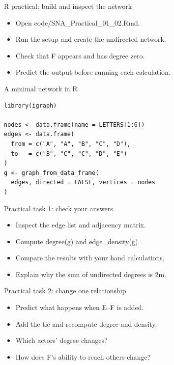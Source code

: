 \documentclass[aspectratio=169,11pt]{beamer}
\begin{document}
\begin{frame}{R practical: build and inspect the network}
\begin{itemize}
\item Open code/SNA\_Practical\_01\_02.Rmd.
\medskip
\item Run the setup and create the undirected network.
\medskip
\item Check that F appears and has degree zero.
\medskip
\item Predict the output before running each calculation.
\medskip
\end{itemize}

\end{frame}

\begin{frame}[fragile]{A minimal network in R}
\begin{lstlisting}
library(igraph)

nodes <- data.frame(name = LETTERS[1:6])
edges <- data.frame(
  from = c("A", "A", "B", "C", "D"),
  to   = c("B", "C", "C", "D", "E")
)
g <- graph_from_data_frame(
  edges, directed = FALSE, vertices = nodes
)
\end{lstlisting}
\end{frame}

\begin{frame}{Practical task 1: check your answers}
\begin{itemize}
\item Inspect the edge list and adjacency matrix.
\medskip
\item Compute degree(g) and edge\_density(g).
\medskip
\item Compare the results with your hand calculations.
\medskip
\item Explain why the sum of undirected degrees is 2m.
\medskip
\end{itemize}

\end{frame}

\begin{frame}{Practical task 2: change one relationship}
\begin{itemize}
\item Predict what happens when E--F is added.
\medskip
\item Add the tie and recompute degree and density.
\medskip
\item Which actors' degree changes?
\medskip
\item How does F's ability to reach others change?
\medskip
\end{itemize}

\end{frame}
\end{document}
